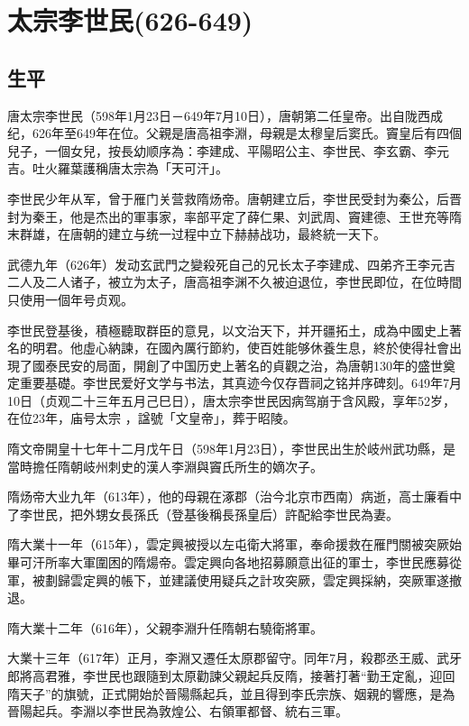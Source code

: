 
\section{太宗李世民\tiny(626-649)}

\subsection{生平}

唐太宗李世民（598年1月23日－649年7月10日），唐朝第二任皇帝。出自陇西成纪，626年至649年在位。父親是唐高祖李淵，母親是太穆皇后窦氏。竇皇后有四個兒子，一個女兒，按長幼顺序為：李建成、平陽昭公主、李世民、李玄霸、李元吉。吐火羅葉護稱唐太宗為「天可汗」。

李世民少年从军，曾于雁门关营救隋炀帝。唐朝建立后，李世民受封为秦公，后晋封为秦王，他是杰出的軍事家，率部平定了薛仁果、刘武周、竇建德、王世充等隋末群雄，在唐朝的建立与统一过程中立下赫赫战功，最終統一天下。

武德九年（626年）发动玄武門之變殺死自己的兄长太子李建成、四弟齐王李元吉二人及二人诸子，被立为太子，唐高祖李渊不久被迫退位，李世民即位，在位時間只使用一個年号贞观。

李世民登基後，積極聽取群臣的意見，以文治天下，并开疆拓土，成為中國史上著名的明君。他虛心納諫，在國內厲行節約，使百姓能够休養生息，終於使得社會出現了國泰民安的局面，開創了中国历史上著名的貞觀之治，為唐朝130年的盛世奠定重要基礎。李世民爱好文学与书法，其真迹今仅存晋祠之铭并序碑刻。649年7月10日（贞观二十三年五月己巳日），唐太宗李世民因病驾崩于含风殿，享年52岁，在位23年，庙号太宗 ，諡號「文皇帝」，葬于昭陵。

隋文帝開皇十七年十二月戊午日（598年1月23日），李世民出生於岐州武功縣，是當時擔任隋朝岐州刺史的漢人李淵與竇氏所生的嫡次子。

隋炀帝大业九年（613年），他的母親在涿郡（治今北京市西南）病逝，高士廉看中了李世民，把外甥女長孫氏（登基後稱長孫皇后）許配給李世民為妻。

隋大業十一年（615年），雲定興被授以左屯衛大將軍，奉命援救在雁門關被突厥始畢可汗所率大軍圍困的隋煬帝。雲定興向各地招募願意出征的軍士，李世民應募從軍，被劃歸雲定興的帳下，並建議使用疑兵之計攻突厥，雲定興採納，突厥軍遂撤退。

隋大業十二年（616年），父親李淵升任隋朝右驍衛將軍。

大業十三年（617年）正月，李淵又遷任太原郡留守。同年7月，殺郡丞王威、武牙郎將高君雅，李世民也跟隨到太原勸諫父親起兵反隋，接著打著“勤王定亂，迎回隋天子”的旗號，正式開始於晉陽縣起兵，並且得到李氏宗族、姻親的響應，是為晉陽起兵。李淵以李世民為敦煌公、右領軍都督、統右三軍。

